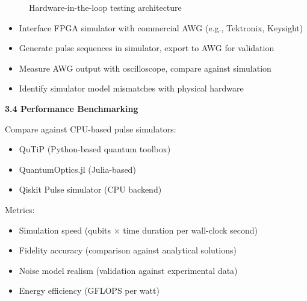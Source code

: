 \documentclass[12pt,a4paper]{article}
\begin{document}
\begin{figure}[h]
\centering
{}
\caption{Hardware-in-the-loop testing architecture}
\label{fig:hil_loop}
\end{figure}

\begin{itemize}[noitemsep]
\item Interface FPGA simulator with commercial AWG (e.g., Tektronix, Keysight)
\item Generate pulse sequences in simulator, export to AWG for validation
\item Measure AWG output with oscilloscope, compare against simulation
\item Identify simulator model mismatches with physical hardware
\end{itemize}

\textbf{3.4 Performance Benchmarking}

Compare against CPU-based pulse simulators:
\begin{itemize}[noitemsep]
\item QuTiP (Python-based quantum toolbox)
\item QuantumOptics.jl (Julia-based)
\item Qiskit Pulse simulator (CPU backend)
\end{itemize}

Metrics:
\begin{itemize}[noitemsep]
\item Simulation speed (qubits $\times$ time duration per wall-clock second)
\item Fidelity accuracy (comparison against analytical solutions)
\item Noise model realism (validation against experimental data)
\item Energy efficiency (GFLOPS per watt)
\end{itemize}
\end{document}
